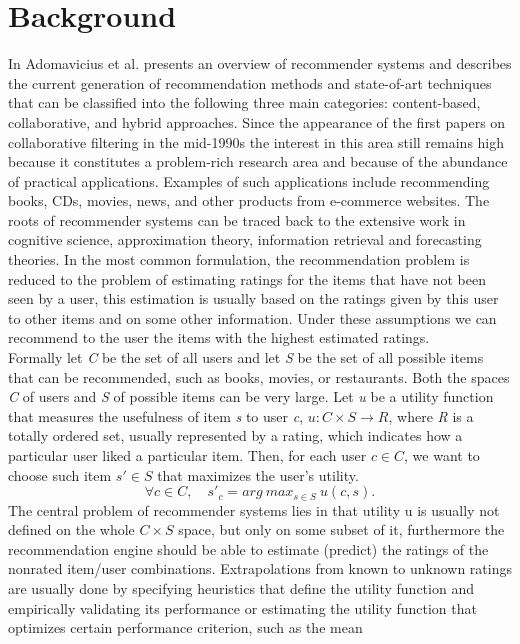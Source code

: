 \documentclass[paper=a4, fontsize=11pt]{scrartcl} %
\numberwithin{equation}{section} %
\numberwithin{figure}{section} %
\numberwithin{table}{section} %
\begin{document}
\section{Background}
In \cite{AdomaviciusTuzhilin} Adomavicius et al. presents an overview of
recommender systems and describes the current generation of recommendation
methods and state-of-art techniques that can be classified into the following
three main categories: content-based, collaborative, and hybrid approaches.
Since the appearance of the first papers on collaborative filtering in the
mid-1990s the interest in this area still remains high because it constitutes a
problem-rich research area and because of the abundance of practical
applications. Examples of such applications include recommending books, CDs,
movies, news, and other products from e-commerce websites. The roots of
recommender systems can be traced back to the extensive work in cognitive
science, approximation theory, information retrieval and forecasting theories.
In the most common formulation, the recommendation problem is reduced to the
problem of estimating ratings for the items that have not been seen by a user,
this estimation is usually based on the ratings given by this user to other
items and on some other information. Under these assumptions we can recommend to
the user the items with the highest estimated ratings.\\
Formally let \textit{C} be the set of all users and let \textit{S} be the set of
all possible items that can be recommended, such as books, movies, or
restaurants. Both the spaces \textit{C} of users and \textit{S} of possible
items can be very large. Let \textit{u} be a utility function that measures the
usefulness of item \textit{s} to user \textit{c}, $u : C \times S \rightarrow
R$, where \textit{R} is a totally ordered set, usually represented by a rating,
which indicates how a particular user liked a particular item.
Then, for each user $c \in C$, we want to choose such item $s' \in S$ that
maximizes the user's utility.
$$\forall c \in C, \quad s'_c = arg \ max_{s \in S} \ u(c,s).$$
The central problem of recommender systems lies in that utility u is usually not
defined on the whole $C \times S$ space, but only on some subset of it,
furthermore the recommendation engine should be able to estimate (predict) the
ratings of the nonrated item/user combinations. Extrapolations from known to
unknown ratings are usually done by specifying heuristics that define the
utility function and empirically validating its performance or estimating the
utility function that optimizes certain performance criterion, such as the mean
\end{document}
